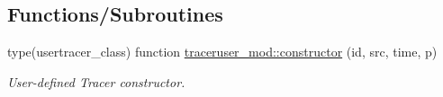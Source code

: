 \subsection*{Functions/\+Subroutines}
\begin{DoxyCompactItemize}
\item 
type(usertracer\+\_\+class) function \mbox{\hyperlink{namespacetraceruser__mod_a9b5d52bbc9611921275ff35fa82a91c5}{traceruser\+\_\+mod\+::constructor}} (id, src, time, p)
\begin{DoxyCompactList}\small\item\em User-\/defined Tracer constructor. \end{DoxyCompactList}\end{DoxyCompactItemize}
